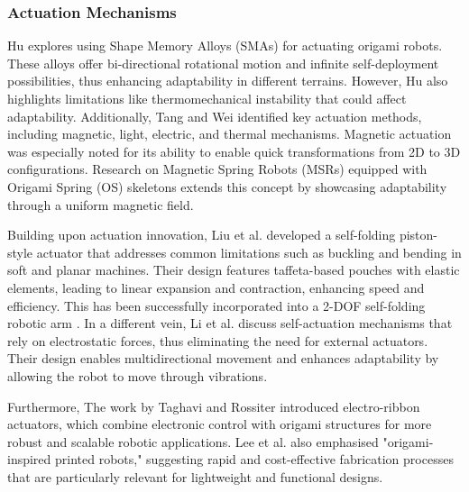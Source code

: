 \documentclass{sigchi}
\begin{document}
\subsubsection{Actuation Mechanisms}
Hu explores using Shape Memory Alloys (SMAs) for actuating origami robots. These alloys offer bi-directional rotational motion and infinite self-deployment possibilities, thus enhancing adaptability in different terrains. However, Hu also highlights limitations like thermomechanical instability that could affect adaptability\cite{hu_review_2021}. Additionally, Tang and Wei identified key actuation methods, including magnetic, light, electric, and thermal mechanisms. Magnetic actuation was especially noted for its ability to enable quick transformations from 2D to 3D configurations. Research on Magnetic Spring Robots (MSRs) equipped with Origami Spring (OS) skeletons extends this concept by showcasing adaptability through a uniform magnetic field\cite{tang_miniaturized_2022}.


Building upon actuation innovation, Liu et al. developed a self-folding piston-style actuator that addresses common limitations such as buckling and bending in soft and planar machines. Their design features taffeta-based pouches with elastic elements, leading to linear expansion and contraction, enhancing speed and efficiency. This has been successfully incorporated into a 2-DOF self-folding robotic arm \cite{liu_self-folding_2019}. In a different vein, Li et al. discuss self-actuation mechanisms that rely on electrostatic forces, thus eliminating the need for external actuators. Their design enables multidirectional movement and enhances adaptability by allowing the robot to move through vibrations\cite{li_soft_2018}.


Furthermore, The work by Taghavi and Rossiter introduced electro-ribbon actuators, which combine electronic control with origami structures for more robust and scalable robotic applications\cite{taghavi_electro-ribbon_2018}. Lee et al. also emphasised "origami-inspired printed robots," suggesting rapid and cost-effective fabrication processes that are particularly relevant for lightweight and functional designs\cite{lee_origami_2018}.
\end{document}
